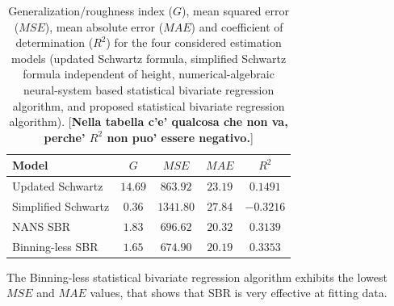 \documentclass[10pt,final]{siamltex}
\begin{document}
\begin{table}[ht]
  \centering
  \begin{tabular}{|l|c|c|c|c|}
    \hline
    \textbf{Model}             &$\mathit{G}$  &$\mathit{MSE}$  &$\mathit{MAE}$  &$R^2$    \\
    \hline
    Updated Schwartz           &$14.69$ &$863.92$  &$23.19$  &$ 0.1491$  \\
    Simplified Schwartz        &$0.36$  &$1341.80$ &$27.84$  &$-0.3216$  \\
    NANS SBR                   &$1.83$  &$696.62$  &$20.32$  &$ 0.3139$  \\
    Binning-less SBR           &$1.65$  &$674.90$  &$20.19$  &$ 0.3353$  \\
    \hline
  \end{tabular}
  \caption{Generalization/roughness index ($\mathit{G}$), mean squared error ($\mathit{MSE}$), mean absolute error ($\mathit{MAE}$) and coefficient of determination ($R^2$) for the four considered estimation models (updated Schwartz formula, simplified Schwartz formula independent of height, numerical-algebraic neural-system based statistical bivariate regression algorithm, and proposed statistical bivariate regression algorithm). [{\bf\red Nella tabella c'e' qualcosa che non va, perche' $R^2$ non puo' essere negativo.}]}
  \label{regstats}
\end{table}

The Binning-less statistical bivariate regression algorithm exhibits the lowest $\textit{MSE}$ and $\textit{MAE}$ values, that shows that SBR is very effective at fitting data.
%
\end{document}
